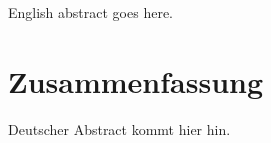 \MakeShortVerb{\|}

\addchaptertocentry{\abstractname}
\section*{\abstractname}

English abstract goes here.



\section*{Zusammenfassung}

Deutscher Abstract kommt hier hin.